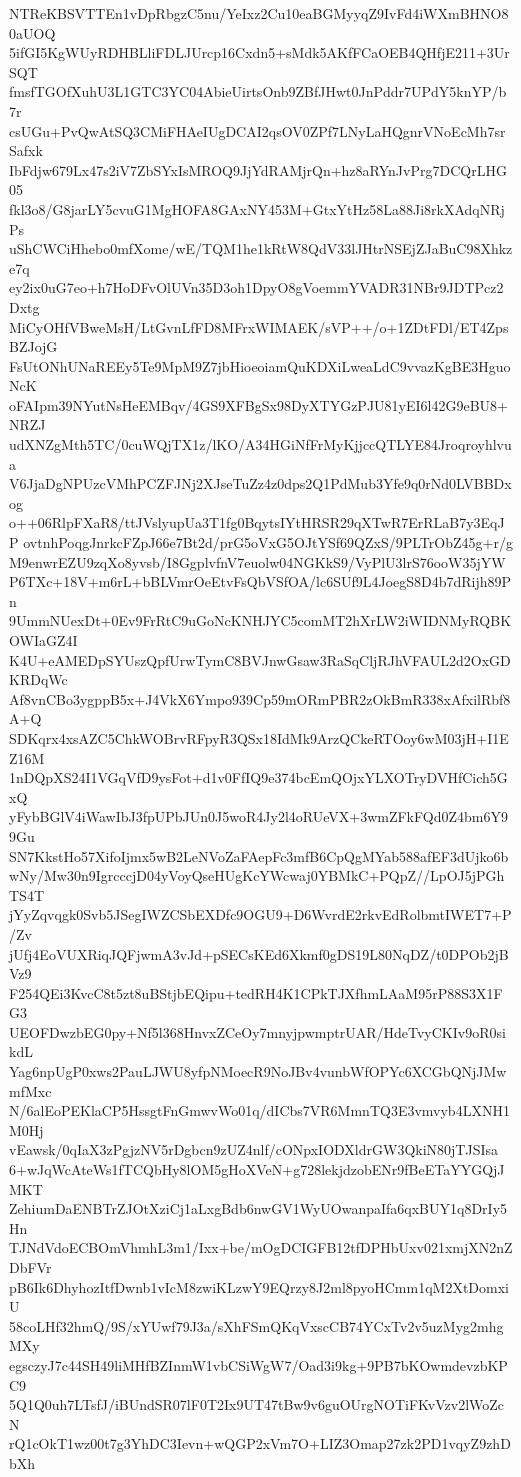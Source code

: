 NTReKBSVTTEn1vDpRbgzC5nu/YeIxz2Cu10eaBGMyyqZ9IvFd4iWXmBHNO80aUOQ
5ifGI5KgWUyRDHBLliFDLJUrcp16Cxdn5+sMdk5AKfFCaOEB4QHfjE211+3UrSQT
fmsfTGOfXuhU3L1GTC3YC04AbieUirtsOnb9ZBfJHwt0JnPddr7UPdY5knYP/b7r
csUGu+PvQwAtSQ3CMiFHAeIUgDCAI2qsOV0ZPf7LNyLaHQgnrVNoEcMh7srSafxk
IbFdjw679Lx47s2iV7ZbSYxIsMROQ9JjYdRAMjrQn+hz8aRYnJvPrg7DCQrLHG05
fkl3o8/G8jarLY5cvuG1MgHOFA8GAxNY453M+GtxYtHz58La88Ji8rkXAdqNRjPs
uShCWCiHhebo0mfXome/wE/TQM1he1kRtW8QdV33lJHtrNSEjZJaBuC98Xhkze7q
ey2ix0uG7eo+h7HoDFvOlUVn35D3oh1DpyO8gVoemmYVADR31NBr9JDTPcz2Dxtg
MiCyOHfVBweMsH/LtGvnLfFD8MFrxWIMAEK/sVP++/o+1ZDtFDl/ET4ZpsBZJojG
FsUtONhUNaREEy5Te9MpM9Z7jbHioeoiamQuKDXiLweaLdC9vvazKgBE3HguoNcK
oFAIpm39NYutNsHeEMBqv/4GS9XFBgSx98DyXTYGzPJU81yEI6l42G9eBU8+NRZJ
udXNZgMth5TC/0cuWQjTX1z/lKO/A34HGiNfFrMyKjjccQTLYE84Jroqroyhlvua
V6JjaDgNPUzcVMhPCZFJNj2XJseTuZz4z0dps2Q1PdMub3Yfe9q0rNd0LVBBDxog
o++06RlpFXaR8/ttJVslyupUa3T1fg0BqytsIYtHRSR29qXTwR7ErRLaB7y3EqJP
ovtnhPoqgJnrkcFZpJ66e7Bt2d/prG5oVxG5OJtYSf69QZxS/9PLTrObZ45g+r/g
M9enwrEZU9zqXo8yvsb/I8GgplvfnV7euolw04NGKkS9/VyPlU3lrS76ooW35jYW
P6TXc+18V+m6rL+bBLVmrOeEtvFsQbVSfOA/lc6SUf9L4JoegS8D4b7dRijh89Pn
9UmmNUexDt+0Ev9FrRtC9uGoNcKNHJYC5comMT2hXrLW2iWIDNMyRQBKOWIaGZ4I
K4U+eAMEDpSYUszQpfUrwTymC8BVJnwGsaw3RaSqCljRJhVFAUL2d2OxGDKRDqWc
Af8vnCBo3ygppB5x+J4VkX6Ympo939Cp59mORmPBR2zOkBmR338xAfxilRbf8A+Q
SDKqrx4xsAZC5ChkWOBrvRFpyR3QSx18IdMk9ArzQCkeRTOoy6wM03jH+I1EZ16M
1nDQpXS24I1VGqVfD9ysFot+d1v0FfIQ9e374bcEmQOjxYLXOTryDVHfCich5GxQ
yFybBGlV4iWawIbJ3fpUPbJUn0J5woR4Jy2l4oRUeVX+3wmZFkFQd0Z4bm6Y99Gu
SN7KkstHo57XifoIjmx5wB2LeNVoZaFAepFc3mfB6CpQgMYab588afEF3dUjko6b
wNy/Mw30n9IgrcccjD04yVoyQseHUgKcYWcwaj0YBMkC+PQpZ//LpOJ5jPGhTS4T
jYyZqvqgk0Svb5JSegIWZCSbEXDfc9OGU9+D6WvrdE2rkvEdRolbmtIWET7+P/Zv
jUfj4EoVUXRiqJQFjwmA3vJd+pSECsKEd6Xkmf0gDS19L80NqDZ/t0DPOb2jBVz9
F254QEi3KvcC8t5zt8uBStjbEQipu+tedRH4K1CPkTJXfhmLAaM95rP88S3X1FG3
UEOFDwzbEG0py+Nf5l368HnvxZCeOy7mnyjpwmptrUAR/HdeTvyCKIv9oR0sikdL
Yag6npUgP0xws2PauLJWU8yfpNMoecR9NoJBv4vunbWfOPYc6XCGbQNjJMwmfMxc
N/6alEoPEKlaCP5HssgtFnGmwvWo01q/dICbs7VR6MmnTQ3E3vmvyb4LXNH1M0Hj
vEawsk/0qIaX3zPgjzNV5rDgbcn9zUZ4nlf/cONpxIODXldrGW3QkiN80jTJSIsa
6+wJqWcAteWs1fTCQbHy8lOM5gHoXVeN+g728lekjdzobENr9fBeETaYYGQjJMKT
ZehiumDaENBTrZJOtXziCj1aLxgBdb6nwGV1WyUOwanpaIfa6qxBUY1q8DrIy5Hn
TJNdVdoECBOmVhmhL3m1/Ixx+be/mOgDCIGFB12tfDPHbUxv021xmjXN2nZDbFVr
pB6Ik6DhyhozItfDwnb1vIcM8zwiKLzwY9EQrzy8J2ml8pyoHCmm1qM2XtDomxiU
58coLHf32hmQ/9S/xYUwf79J3a/sXhFSmQKqVxscCB74YCxTv2v5uzMyg2mhgMXy
egsczyJ7c44SH49liMHfBZInmW1vbCSiWgW7/Oad3i9kg+9PB7bKOwmdevzbKPC9
5Q1Q0uh7LTsfJ/iBUndSR07lF0T2Ix9UT47tBw9v6guOUrgNOTiFKvVzv2lWoZcN
rQ1cOkT1wz00t7g3YhDC3Ievn+wQGP2xVm7O+LIZ3Omap27zk2PD1vqyZ9zhDbXh
